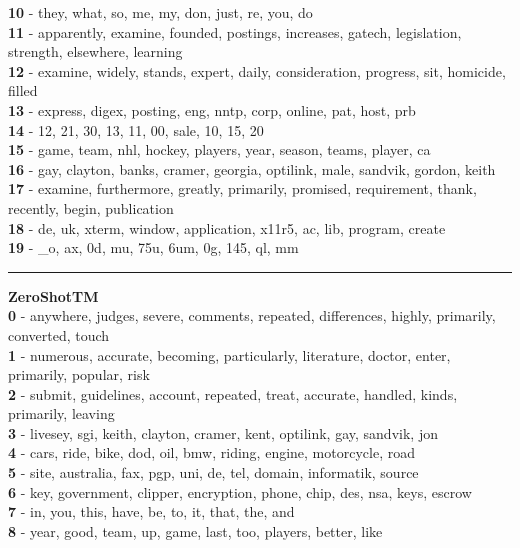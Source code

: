 \textbf{10} - they, what, so, me, my, don, just, re, you, do\\
\textbf{11} - apparently, examine, founded, postings, increases, gatech, legislation, strength, elsewhere, learning\\
\textbf{12} - examine, widely, stands, expert, daily, consideration, progress, sit, homicide, filled\\
\textbf{13} - express, digex, posting, eng, nntp, corp, online, pat, host, prb\\
\textbf{14} - 12, 21, 30, 13, 11, 00, sale, 10, 15, 20\\
\textbf{15} - game, team, nhl, hockey, players, year, season, teams, player, ca\\
\textbf{16} - gay, clayton, banks, cramer, georgia, optilink, male, sandvik, gordon, keith\\
\textbf{17} - examine, furthermore, greatly, primarily, promised, requirement, thank, recently, begin, publication\\
\textbf{18} - de, uk, xterm, window, application, x11r5, ac, lib, program, create\\
\textbf{19} - \_o, ax, 0d, mu, 75u, 6um, 0g, 145, ql, mm\\
\hrule\vspace{2mm}
\noindent
\textbf{ZeroShotTM}\vspace{2mm}\\
\vspace{2mm}
\noindent
\textbf{0} - anywhere, judges, severe, comments, repeated, differences, highly, primarily, converted, touch\\
\textbf{1} - numerous, accurate, becoming, particularly, literature, doctor, enter, primarily, popular, risk\\
\textbf{2} - submit, guidelines, account, repeated, treat, accurate, handled, kinds, primarily, leaving\\
\textbf{3} - livesey, sgi, keith, clayton, cramer, kent, optilink, gay, sandvik, jon\\
\textbf{4} - cars, ride, bike, dod, oil, bmw, riding, engine, motorcycle, road\\
\textbf{5} - site, australia, fax, pgp, uni, de, tel, domain, informatik, source\\
\textbf{6} - key, government, clipper, encryption, phone, chip, des, nsa, keys, escrow\\
\textbf{7} - in, you, this, have, be, to, it, that, the, and\\
\textbf{8} - year, good, team, up, game, last, too, players, better, like\\

